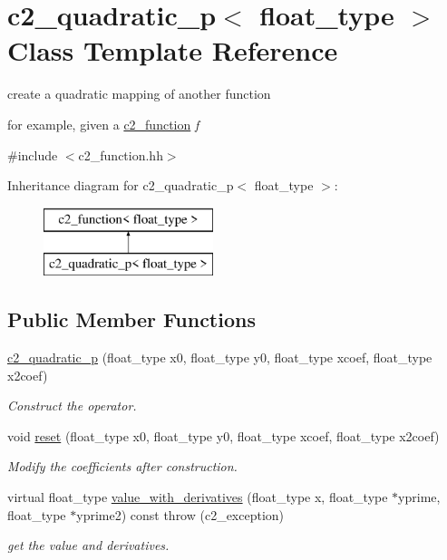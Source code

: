 \hypertarget{classc2__quadratic__p}{\section{c2\-\_\-quadratic\-\_\-p$<$ float\-\_\-type $>$ Class Template Reference}
\label{classc2__quadratic__p}
}


create a quadratic mapping of another function

for example, given a \hyperlink{classc2__function}{c2\-\_\-function} {\itshape f}  




{\ttfamily \#include $<$c2\-\_\-function.\-hh$>$}

Inheritance diagram for c2\-\_\-quadratic\-\_\-p$<$ float\-\_\-type $>$\-:\begin{figure}[H]
\begin{center}
\leavevmode
\includegraphics[height=2.000000cm]{classc2__quadratic__p}
\end{center}
\end{figure}
\subsection*{Public Member Functions}
\begin{DoxyCompactItemize}
\item 
\hyperlink{classc2__quadratic__p_a767070d7f86b63725c487fb4efa05dd3}{c2\-\_\-quadratic\-\_\-p} (float\-\_\-type x0, float\-\_\-type y0, float\-\_\-type xcoef, float\-\_\-type x2coef)
\begin{DoxyCompactList}\small\item\em Construct the operator. \end{DoxyCompactList}\item 
void \hyperlink{classc2__quadratic__p_a6db1d57b13356c732236b4df69a3570a}{reset} (float\-\_\-type x0, float\-\_\-type y0, float\-\_\-type xcoef, float\-\_\-type x2coef)
\begin{DoxyCompactList}\small\item\em Modify the coefficients after construction. \end{DoxyCompactList}\item 
virtual float\-\_\-type \hyperlink{classc2__quadratic__p_ade79e98941853a179b2be14b6cc6daa3}{value\-\_\-with\-\_\-derivatives} (float\-\_\-type x, float\-\_\-type $\ast$yprime, float\-\_\-type $\ast$yprime2) const   throw (c2\-\_\-exception)
\begin{DoxyCompactList}\small\item\em get the value and derivatives. \end{DoxyCompactList}\end{DoxyCompactItemize}
